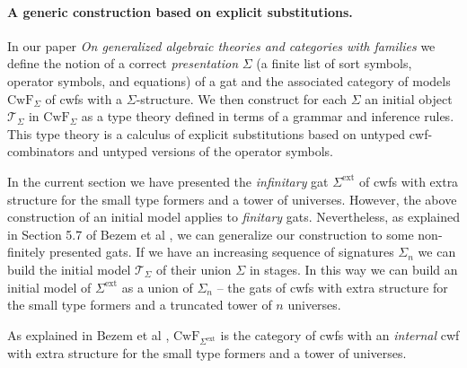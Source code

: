 \documentclass[11pt,a4paper]{article}
\theoremstyle{plain}
\theoremstyle{definition}
\newcommand{\T}{\mathsf{T}}
\def\p{\mathrm{p}}
\def\q{\mathrm{q}}
\def\T{\mathcal{T}}
\def\CwF{\mathrm{CwF}}
\def\Sigmaext{{\Sigma^\mathrm{ext}}}
\begin{document}
\paragraph{A generic construction based on explicit substitutions.} In our paper {\em On generalized algebraic theories and categories with families} \cite{bezem:hofmann} we define the notion of a correct {\em presentation} $\Sigma$ (a finite list of sort symbols, operator symbols, and equations) of a gat and the associated category of models $\CwF_\Sigma$ of cwfs with a $\Sigma$-structure. We then construct for each $\Sigma$ an initial object $\T_\Sigma$ in $\CwF_\Sigma$ as a type theory defined in terms of a grammar and inference rules. This type theory is a calculus of explicit substitutions based on untyped cwf-combinators and untyped versions of the operator symbols. 

In the current section we have presented the {\em infinitary} gat $\Sigmaext$ of cwfs with extra structure for the small type formers and a tower of universes. However, the above construction of an initial model applies to {\em finitary} gats. Nevertheless, as explained in Section 5.7 of Bezem et al  \cite{bezem:hofmann}, we can generalize our construction to some non-finitely presented gats. If we have an increasing sequence of signatures $\Sigma_n$ we can build the initial model $\T_\Sigma$ of their union $\Sigma$ in stages. In this way we can build an initial model of $\Sigmaext$ as a union of $\Sigma_n$ -- the gats of cwfs with extra structure for the small type formers and a truncated tower of $n$ universes. 

As explained in Bezem et al \cite{bezem:hofmann}, $\CwF_{\Sigmaext}$ is the category of cwfs with an {\em internal} cwf with extra structure for the small type formers and a tower of universes. 
\end{document}
